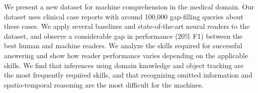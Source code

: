 We present a new dataset for machine comprehension in the medical domain. Our dataset uses clinical case reports with around 100,000 gap-filling queries about these cases. We apply several baselines and state-of-the-art neural readers to the dataset, and observe a considerable gap in performance (20\% F1) between the best human and machine readers. We analyze the skills required for successful answering and show how reader performance varies depending on the applicable skills. We find that inferences using domain knowledge and object tracking are the most frequently required skills, and that recognizing omitted information and spatio-temporal reasoning are the most difficult for the machines.
